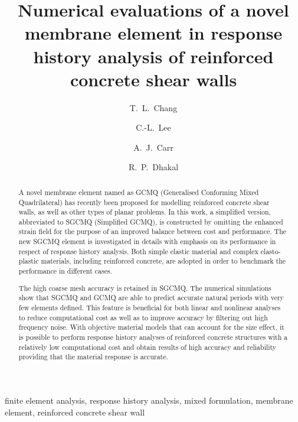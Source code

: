 \documentclass[3p,sort&compress,review,11pt,fleqn]{elsarticle}
\begin{document}
\begin{abstract}
A novel membrane element named as GCMQ (Generalised Conforming Mixed Quadrilateral) has recently been proposed for modelling reinforced concrete shear walls, as well as other types of planar problems. In this work, a simplified version, abbreviated to SGCMQ (Simplified GCMQ), is constructed by omitting the enhanced strain field for the purpose of an improved balance between cost and performance. The new SGCMQ element is investigated in details with emphasis on its performance in respect of response history analysis. Both simple elastic material and complex elasto-plastic materials, including reinforced concrete, are adopted in order to benchmark the performance in different cases.

The high coarse mesh accuracy is retained in SGCMQ. The numerical simulations show that SGCMQ and GCMQ are able to predict accurate natural periods with very few elements defined. This feature is beneficial for both linear and nonlinear analyses to reduce computational cost as well as  to improve accuracy by filtering out high frequency noise. With objective material models that can account for the size effect, it is possible to perform response history analyses of reinforced concrete structures with a relatively low computational cost and obtain results of high accuracy and reliability providing that the material response is accurate.
\end{abstract}
\begin{keyword}
finite element analysis\sep
response history analysis\sep
mixed formulation\sep
membrane element\sep
reinforced concrete shear wall
\end{keyword}
\begin{frontmatter}
\title{Numerical evaluations of a novel membrane element in response history analysis of reinforced concrete shear walls}
\author[add1]{T.~L.~Chang}
\author[add1]{C.-L.~Lee}
\author[add1]{A.~J.~Carr}
\author[add1]{R.~P.~Dhakal}
\address[add1]{Department of Civil and Natural Resources Engineering, University of Canterbury, Christchurch, NZ, 8041.}
\end{frontmatter}
\end{document}
